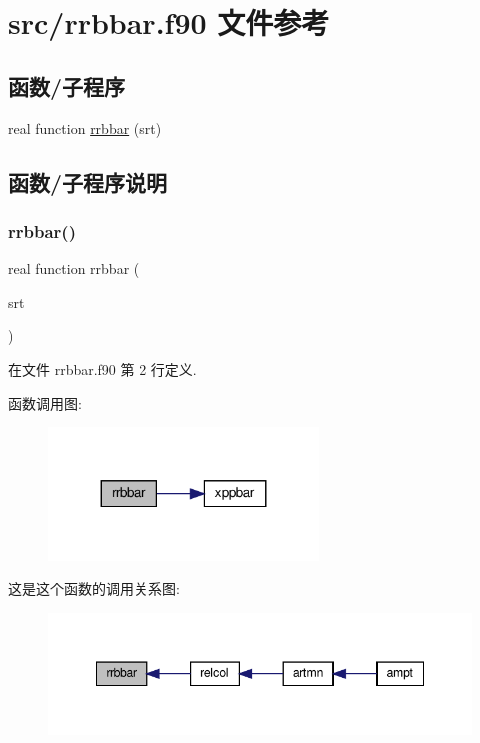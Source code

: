 \hypertarget{rrbbar_8f90}{}\section{src/rrbbar.f90 文件参考}
\label{rrbbar_8f90}
\subsection*{函数/子程序}
\begin{DoxyCompactItemize}
\item 
real function \mbox{\hyperlink{rrbbar_8f90_a6d06e225883ba1932ad1c8951cfd1811}{rrbbar}} (srt)
\end{DoxyCompactItemize}


\subsection{函数/子程序说明}
\mbox{\label{rrbbar_8f90_a6d06e225883ba1932ad1c8951cfd1811}} 
\subsubsection{\texorpdfstring{rrbbar()}{rrbbar()}}
{\footnotesize\ttfamily real function rrbbar (\begin{DoxyParamCaption}\item[{}]{srt }\end{DoxyParamCaption})}



在文件 rrbbar.\+f90 第 2 行定义.

函数调用图\+:
\nopagebreak
\begin{figure}[H]
\begin{center}
\leavevmode
\includegraphics[width=203pt]{rrbbar_8f90_a6d06e225883ba1932ad1c8951cfd1811_cgraph}
\end{center}
\end{figure}
这是这个函数的调用关系图\+:
\nopagebreak
\begin{figure}[H]
\begin{center}
\leavevmode
\includegraphics[width=348pt]{rrbbar_8f90_a6d06e225883ba1932ad1c8951cfd1811_icgraph}
\end{center}
\end{figure}
